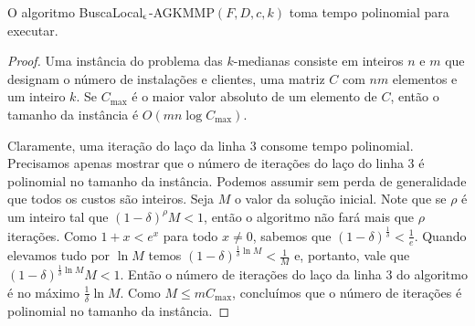 \begin{theorem}
    O algoritmo {\sc BuscaLocal$_\epsilon$-AGKMMP$(F,D,c,k)$} toma tempo polinomial para executar.
\end{theorem}
\begin{proof}
    Uma instância do problema das $k$-medianas consiste em inteiros $n$ e $m$ que designam o número de instalações e clientes, uma matriz $C$ com $nm$ elementos e um inteiro $k$. Se $C_\text{max}$ é o maior valor absoluto de um elemento de $C$, então o tamanho da instância é $O(mn\log{C_\text{max}})$. 

    Claramente, uma iteração do laço da linha 3 consome tempo polinomial. Precisamos apenas mostrar que o número de iterações do laço do linha 3 é polinomial no tamanho da instância.
    Podemos assumir sem perda de generalidade que todos os custos são inteiros. Seja $M$ o valor da solução inicial. Note que se $\rho$ é um inteiro tal que $(1-\delta)^\rho M < 1$, então o algoritmo não fará mais que $\rho$ iterações. Como $ 1 + x < e^x$ para todo $x\neq 0$, sabemos que $(1 - \delta)^{\frac{1}{\delta}} < \frac{1}{e}$. Quando elevamos tudo por $\ln M$ temos $(1- \delta)^{\frac{1}{\delta}\ln M} < \frac{1}{M}$ e, portanto, vale que $ (1- \delta)^{\frac{1}{\delta}\ln M}M < 1$. Então o número de iterações do laço da linha 3 do algoritmo é no máximo $\frac{1}{\delta}\ln M$. Como $M \leq m C_\text{max}$, concluímos que o número de iterações é polinomial no tamanho da instância.
\end{proof}